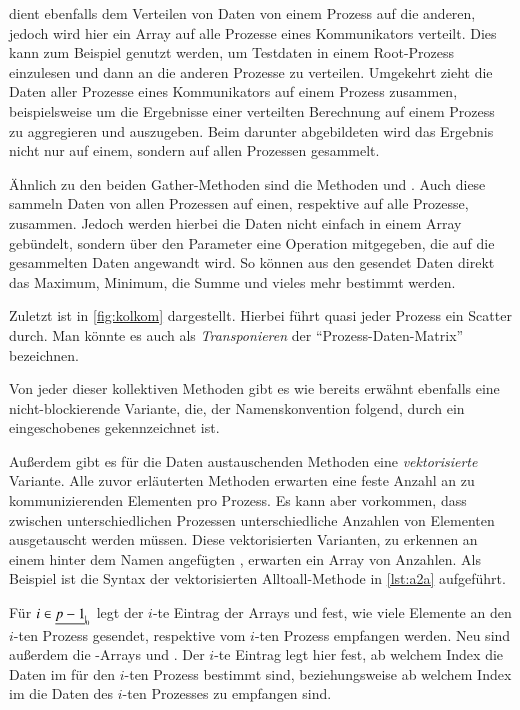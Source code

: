        dient ebenfalls dem Verteilen von Daten von einem Prozess auf die anderen, jedoch wird hier ein Array auf alle Prozesse eines Kommunikators verteilt.
      Dies kann zum Beispiel genutzt werden, um Testdaten in einem Root-Prozess einzulesen und dann an die anderen Prozesse zu verteilen. Umgekehrt zieht  die
      Daten aller Prozesse eines Kommunikators auf einem Prozess zusammen, beispielsweise um die Ergebnisse einer verteilten Berechnung auf einem Prozess zu aggregieren und
      auszugeben. Beim darunter abgebildeten  wird das Ergebnis nicht nur auf einem, sondern auf allen Prozessen gesammelt. \citep{mpitut, mpiv31}
      
      Ähnlich zu den beiden Gather-Methoden sind die Methoden  und . Auch diese sammeln Daten von allen Prozessen auf einen, respektive
      auf alle Prozesse, zusammen. Jedoch werden hierbei die Daten nicht einfach in einem Array gebündelt, sondern über den Parameter  eine Operation mitgegeben,
      die auf die gesammelten Daten angewandt wird. So können aus den gesendet Daten direkt das Maximum, Minimum, die Summe und vieles mehr bestimmt werden. \citep{mpitut, mpiv31}
      
      Zuletzt ist  in \autoref{fig:kolkom} dargestellt. Hierbei führt quasi jeder Prozess ein Scatter durch. Man könnte es auch als \textit{Transponieren} der
      ``Prozess-Daten-Matrix'' bezeichnen. \citep{mpiv31}
      
      Von jeder dieser kollektiven Methoden gibt es wie bereits erwähnt ebenfalls eine nicht-blockierende Variante, die, der Namenskonvention folgend, durch ein eingeschobenes 
      gekennzeichnet ist. 
      
      Außerdem gibt es für die Daten austauschenden Methoden eine \textit{vektorisierte} Variante. Alle zuvor erläuterten Methoden erwarten eine feste Anzahl an zu 
      kommunizierenden Elementen pro Prozess.
      Es kann aber vorkommen, dass zwischen unterschiedlichen Prozessen unterschiedliche Anzahlen von Elementen ausgetauscht werden müssen. Diese vektorisierten Varianten, zu erkennen an
      einem hinter dem Namen angefügten , erwarten ein Array von Anzahlen.
      Als Beispiel ist die Syntax der vektorisierten Alltoall-Methode in \autoref{lst:a2a} aufgeführt.
      
      Für $i \in \nullhaken{p-1}$ legt der $i$-te Eintrag der Arrays  und  fest, wie viele Elemente an den $i$-ten Prozess gesendet, respektive vom $i$-ten
      Prozess empfangen werden. Neu sind außerdem die -Arrays  und . Der $i$-te Eintrag legt hier fest, ab welchem Index die Daten im 
       für den $i$-ten Prozess bestimmt sind, beziehungsweise ab welchem Index im  die Daten des $i$-ten Prozesses zu empfangen sind. \citep{mpiv31}


      \clearpage
      
      